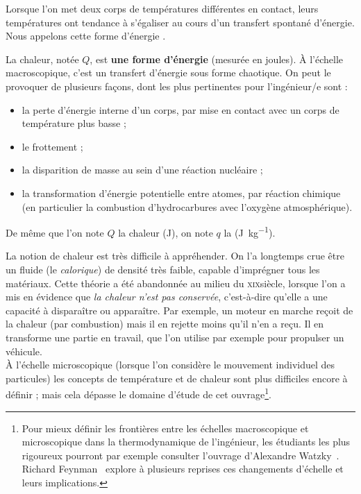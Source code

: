 		Lorsque l’on met deux corps de températures différentes en contact, leurs températures ont tendance à s’égaliser au cours d’un transfert spontané d’énergie. Nous appelons cette forme d’énergie .

		La chaleur, notée $Q$, est \textbf{une forme d’énergie} (mesurée en \si{joules}). À l’échelle macroscopique, c’est un transfert d’énergie sous forme chaotique. On peut le provoquer de plusieurs façons, dont les plus pertinentes pour l’ingénieur/e sont :

		\begin{itemize}
		
			\item la perte d’énergie interne d’un corps, par mise en contact avec un corps de température plus basse ;
		\onlyframabook{\end{itemize}\par\vspace{-1em}\begin{itemize}}%

			\item le frottement ;
			
			\item la disparition de masse au sein d’une réaction nucléaire ;
			
			\item la transformation d’énergie potentielle entre atomes, par réaction chimique (en particulier la combustion d’hydrocarbures avec l’oxygène atmosphérique).

		\end{itemize}
		
		De même que l’on note $Q$ la chaleur (\si{\joule}), on note $q$ la  (\si{\joule\per\kilogram}).
		
		La notion de chaleur est très difficile à appréhender. On l’a longtemps crue être un fluide (le \textit{calorique}) de densité très faible, capable d’imprégner tous les matériaux. Cette théorie a été abandonnée au milieu du \textsc{xix}\ieme siècle, lorsque l’on a mis en évidence que \textit{la chaleur n’est pas conservée}, c’est-à-dire qu’elle a une capacité à disparaître ou apparaître. Par exemple, un moteur en marche reçoit de la chaleur (par combustion) mais il en rejette moins qu’il n’en a reçu. Il en transforme une partie en travail, que l’on utilise par exemple pour propulser un véhicule. \\
		À l’échelle microscopique (lorsque l’on considère le mouvement individuel des particules) les concepts de température et de chaleur sont plus difficiles encore à définir ; mais cela dépasse le domaine d’étude de cet ouvrage\footnote{Pour mieux définir les frontières entre les échelles macroscopique et microscopique dans la thermodynamique de l’ingénieur, les étudiants les plus rigoureux pourront par exemple consulter l’ouvrage d’Alexandre Watzky~\cite{watzky2007}. Richard Feynman~\cite{feynman1963, feynman1963fr} explore à plusieurs reprises ces changements d’échelle et leurs implications.}\nolinebreak.


